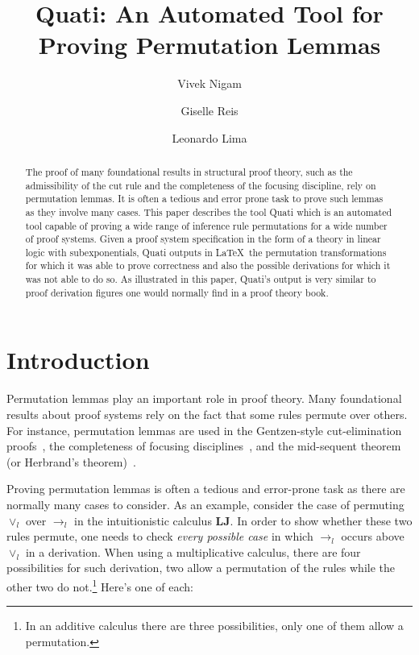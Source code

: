\documentclass{llncs}
\title{Quati: An Automated Tool for Proving Permutation Lemmas}
\author{Vivek Nigam\inst{1} \and Giselle Reis\inst{2} \and Leonardo Lima\inst{1}}
\institute{Universidade Federal da Para\'{i}ba, Brazil
\and Technische Universit\"{a}t Wien, Austria
}
\begin{document}
\maketitle

\begin{abstract}
The proof of many foundational results in structural proof theory, such as the
admissibility of the cut rule and the completeness of the focusing discipline,
rely on permutation lemmas. It is often a tedious and error prone task to prove
such lemmas as they involve many cases. This paper describes the tool Quati
which is an automated tool capable of proving a wide range of inference rule
permutations for a wide number of proof systems. Given a proof system
specification in the form of a theory in linear logic with subexponentials,
Quati outputs in \LaTeX\ the permutation transformations for which it was able
to prove correctness and also the 
possible derivations for which it was not able to do so. As illustrated in this
paper, Quati's output is very similar to proof derivation figures one would
normally find in a proof theory book. 
\end{abstract}

\section{Introduction}

Permutation lemmas play an important role in proof theory. Many foundational
results about proof systems rely on the fact that some rules
permute over others. For instance, permutation lemmas are used in the Gentzen-style 
cut-elimination proofs~\cite{gentzen}, the completeness of focusing disciplines~\cite{miller07cslb,miller}, 
and the mid-sequent theorem (or Herbrand's theorem)~\cite{herbrand}.

Proving permutation lemmas is often a tedious and error-prone task as there are normally many 
cases to consider. As an example, consider the case of permuting $\vee_l$ over $\rightarrow_l$ in
the intuitionistic calculus \textbf{LJ}. In order to show whether these two
rules permute, one needs to check \emph{every possible case} in which
$\rightarrow_l$ occurs above $\vee_l$ in a derivation. When using a
multiplicative calculus, there are four possibilities for such derivation, two
allow a permutation of the rules while the other two do not.\footnote{In an
additive calculus there are three possibilities, only one of them allow a
permutation.} Here's one of each:
\vspace{-4mm}
\end{document}
